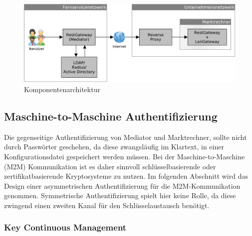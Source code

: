 \documentclass[11pt,a4paper]{report}
\begin{document}
\begin{figure}[htbp]
\centering
\includegraphics[scale=0.5]{images/design_architecture_auth_user.pdf}
\caption{Komponentenarchitektur}
\label{fig:design_authu}
\end{figure}

\subsection{Maschine-to-Maschine Authentifizierung}

Die gegenseitige Authentifizierung von Mediator und Marktrechner, sollte nicht durch Passwörter geschehen, da diese zwangsläufig im Klartext, in einer Konfigurationsdatei gespeichert werden müssen. Bei der Maschine-to-Maschine (M2M) Kommunikation ist es daher sinnvoll schlüsselbasierende oder zertifikatbasierende Kryptosysteme zu nutzen. Im folgenden Abschnitt wird das Design einer asymmetrischen Authentifizierung für die M2M-Kommunikation genommen. Symmetrische Authentifizierung spielt hier keine Rolle, da diese zwingend einen zweiten Kanal für den Schlüsselaustausch benötigt.

\subsubsection{Key Continuous Management}
\end{document}
